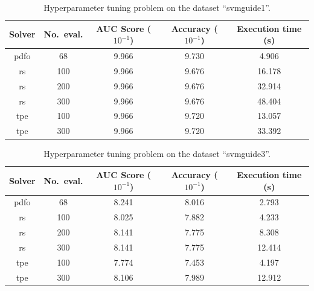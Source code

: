 \documentclass[11pt,draft]{article}
\numberwithin{equation}{section}
\begin{document}
\begin{table}[!ht]
    \caption{Hyperparameter tuning problem on the dataset \enquote{svmguide1}.}
    \centering
    \begin{tabular}{cS[table-parse-only]SSS}
        \toprule
        Solver                          &
            {No.\ eval.}                &
            {AUC Score ($10^{-1}$)}     &
            {Accuracy ($10^{-1}$)}      &
            {Execution time (\si{\second})}\\
        \midrule
        \gls{pdfo}  & 68    & 9.966 & 9.730 & 4.906\\
        \gls{rs}    & 100   & 9.966 & 9.676 & 16.178\\
        \gls{rs}    & 200   & 9.966 & 9.676 & 32.914\\
        \gls{rs}    & 300   & 9.966 & 9.676 & 48.404\\
        \gls{tpe}   & 100   & 9.966 & 9.720 & 13.057\\
        \gls{tpe}   & 300   & 9.966 & 9.720 & 33.392\\
        \bottomrule
    \end{tabular}
\end{table}

\begin{table}[!ht]
    \caption{Hyperparameter tuning problem on the dataset \enquote{svmguide3}.}
    \centering
    \begin{tabular}{cS[table-parse-only]SSS}
        \toprule
        Solver                          &
            {No.\ eval.}                &
            {AUC Score ($10^{-1}$)}     &
            {Accuracy ($10^{-1}$)}      &
            {Execution time (\si{\second})}\\
        \midrule
        \gls{pdfo}  & 68    & 8.241 & 8.016 & 2.793\\
        \gls{rs}    & 100   & 8.025 & 7.882 & 4.233\\
        \gls{rs}    & 200   & 8.141 & 7.775 & 8.308\\
        \gls{rs}    & 300   & 8.141 & 7.775 & 12.414\\
        \gls{tpe}   & 100   & 7.774 & 7.453 & 4.197\\
        \gls{tpe}   & 300   & 8.106 & 7.989 & 12.912\\
        \bottomrule
    \end{tabular}
\end{table}
\end{document}
